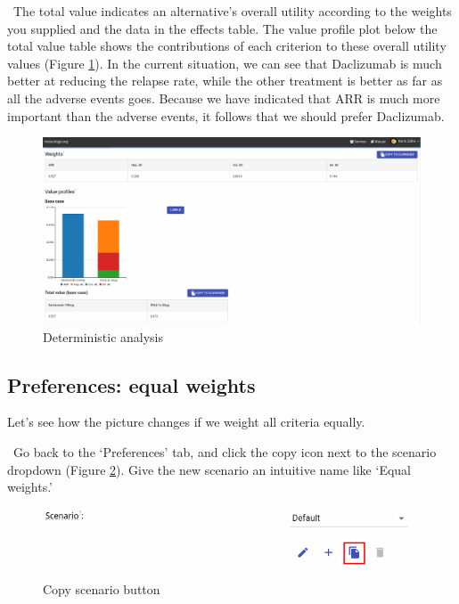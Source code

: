 \documentclass[00_mcda_tutorial.tex]{subfiles}
\begin{document}
\noindent \faGraduationCap \, The total value indicates an alternative’s overall utility according to the weights you supplied and the data in the effects table. The value profile plot below the total value table shows the contributions of each criterion to these overall utility values (Figure \ref{fig:deterministic_ranked}). In the current situation, we can see that Daclizumab is much better at reducing the relapse rate, while the other treatment is better as far as all the adverse events goes. Because we have indicated that ARR is much more important than the adverse events, it follows that we should prefer Daclizumab.

\begin{figure}[!h]
  \centering
  \includegraphics[width=\textwidth]{fig/deterministicRanked.png}
  \caption{Deterministic analysis}
  \label{fig:deterministic_ranked}
\end{figure}

\subsection*{Preferences: equal weights}
Let’s see how the picture changes if we weight all criteria equally.
\newline

\noindent \leftpointright \, Go back to the ‘Preferences’ tab, and click the copy icon next to the scenario dropdown (Figure \ref{fig:copy_scenario}). Give the new scenario an intuitive name like ‘Equal weights.’
\newline

\begin{figure}[!h]
  \centering
  \includegraphics[width=.5\textwidth]{fig/copyScenario.png}
  \caption{Copy scenario button}
  \label{fig:copy_scenario}
\end{figure}
\end{document}
